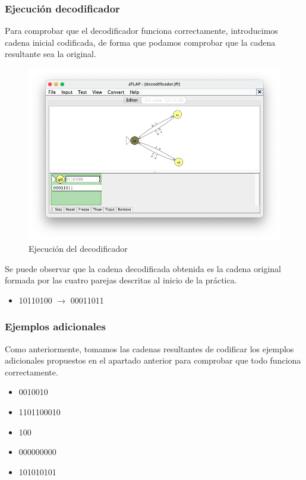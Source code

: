 \subsubsection{Ejecución decodificador}

Para comprobar que el decodificador funciona correctamente, introducimos cadena inicial codificada, de forma que podamos comprobar que la cadena resultante sea la original.

\begin{figure}[H] 
	\centering
	\includegraphics[scale=0.55]{../practica_3/images/ejecucion_decodificador.png} 
	\caption{Ejecución del decodificador} 
    \label{fig:ejecucion_decodificador}
\end{figure}

Se puede observar que la cadena decodificada obtenida es la cadena original formada por las cuatro parejas descritas al inicio de la práctica.

\begin{itemize}
	\item 10110100 $\rightarrow$ 00011011
\end{itemize}

\subsubsection{Ejemplos adicionales}

Como anteriormente, tomamos las cadenas resultantes de codificar los ejemplos adicionales propuestos en el apartado anterior para comprobar que todo funciona correctamente. 
\begin{itemize}
	\item 0010010
	\item 1101100010
	\item 100
	\item 000000000
	\item 101010101
\end{itemize}

